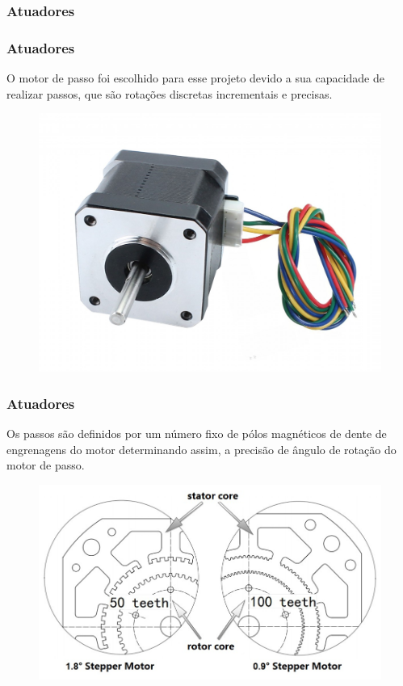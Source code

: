 \subsubsection{Atuadores}

\begin{frame}
\frametitle{Atuadores}

O motor de passo foi escolhido para esse projeto devido a sua capacidade de realizar passos, que são rotações discretas incrementais e precisas. 

\begin{figure}
\centering
\includegraphics[scale = 0.1]{figuras/motordepassoex}
\end{figure}

\end{frame}

\begin{frame}
\frametitle{Atuadores}

Os passos são definidos por um número fixo de pólos magnéticos de dente de engrenagens do motor determinando assim, a precisão de ângulo de rotação do motor de passo.

\begin{figure}
\centering
\includegraphics[scale = 0.2]{figuras/didaticopasso}
\end{figure}

\end{frame}

